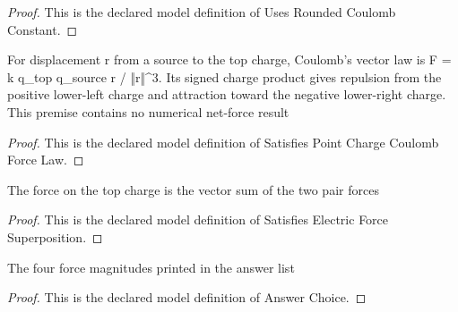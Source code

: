 \begin{proof}
  This is the declared model definition of Uses Rounded Coulomb Constant.
\end{proof}
\begin{definition}
  \label{def:physics:phyx-mini-0894:phyxminiproblems-problemphyxmini0894-satisfiespointchargecoulombforcelaw}
  For displacement r from a source to the top charge, Coulomb's vector law is F = k q\_top q\_source r / ‖r‖\textasciicircum{}3. Its signed charge product gives repulsion from the positive lower-left charge and attraction toward the negative lower-right charge. This premise contains no numerical net-force result
\end{definition}
\begin{proof}
  This is the declared model definition of Satisfies Point Charge Coulomb Force Law.
\end{proof}
\begin{definition}
  \label{def:physics:phyx-mini-0894:phyxminiproblems-problemphyxmini0894-satisfieselectricforcesuperposition}
  The force on the top charge is the vector sum of the two pair forces
\end{definition}
\begin{proof}
  This is the declared model definition of Satisfies Electric Force Superposition.
\end{proof}
\begin{definition}
  \label{def:physics:phyx-mini-0894:phyxminiproblems-problemphyxmini0894-answerchoice}
  The four force magnitudes printed in the answer list
\end{definition}
\begin{proof}
  This is the declared model definition of Answer Choice.
\end{proof}
